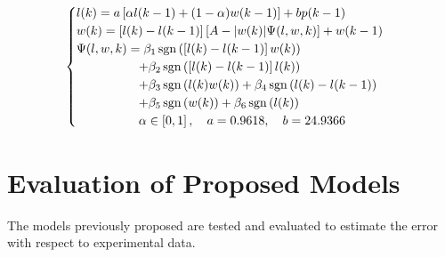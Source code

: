 \begin{equation}
	\begin{cases}
		l(k) = a \left [\alpha l(k-1) + (1-\alpha)w(k-1) \right] + bp(k-1) \\
		w(k) = \left[l(k)-l(k-1)\right]\left[A-\abs{w(k)}\Psi(l,w,k)\right]+w(k-1) \\
		\Psi(l,w,k) = \beta_1\operatorname{sgn}\left(\left[l(k)-l(k-1)\right]w(k)\right) \\
		\qquad \qquad \quad+\beta_2\operatorname{sgn}\left(\left[l(k)-l(k-1)\right]l(k)\right) \\
		\qquad \qquad \quad+\beta_3\operatorname{sgn}\left(l(k)w(k)\right) + \beta_4\operatorname{sgn}\left(l(k)-l(k-1)\right) \\
		\qquad \qquad \quad+\beta_5 \operatorname{sgn}\left(w(k)\right) + \beta_6 \operatorname{sgn}\left(l(k)\right) \\
		\qquad \qquad \quad \alpha \in \left[0,1\right],\quad a = 0.9618, \quad b=24.9366
	\end{cases}
	\label{eq:final_gen}
\end{equation}

\section{Evaluation of Proposed Models}

The models previously proposed are tested and evaluated to estimate
the error with respect to experimental data. 








